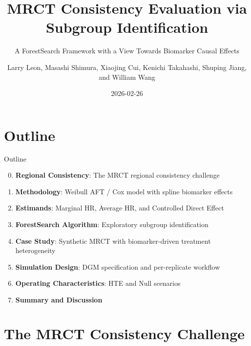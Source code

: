 \documentclass[
  ignorenonframetext,
  aspectratio=169]{beamer}
\title{MRCT Consistency Evaluation via Subgroup Identification}
\subtitle{A ForestSearch Framework with a View Towards Biomarker Causal
Effects}
\author{Larry Leon, Masashi Shimura, Xiaojing Cui, Kenichi Takahashi,
Shuping Jiang, and William Wang}
\date{2026-02-26}
\providecommand{\tightlist}{%
  \setlength{\itemsep}{0pt}\setlength{\parskip}{0pt}}
\begin{document}
\frame{\titlepage}

\section{Outline}\label{outline}

\begin{frame}{Outline}
\begin{enumerate}
\setcounter{enumi}{-1}
\tightlist
\item
  \textbf{Regional Consistency}: The MRCT regional consistency challenge
\item
  \textbf{Methodology}: Weibull AFT / Cox model with spline biomarker
  effects
\item
  \textbf{Estimands}: Marginal HR, Average HR, and Controlled Direct
  Effect
\item
  \textbf{ForestSearch Algorithm}: Exploratory subgroup identification
\item
  \textbf{Case Study}: Synthetic MRCT with biomarker-driven treatment
  heterogeneity
\item
  \textbf{Simulation Design}: DGM specification and per-replicate
  workflow
\item
  \textbf{Operating Characteristics}: HTE and Null scenarios
\item
  \textbf{Summary and Discussion}
\end{enumerate}
\end{frame}

\section{The MRCT Consistency
Challenge}\label{the-mrct-consistency-challenge}
\end{document}

